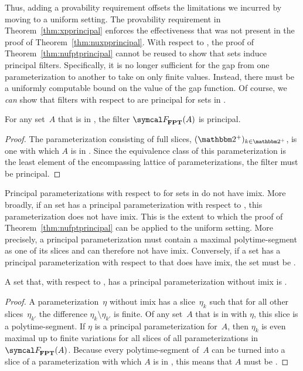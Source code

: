 Thus, adding a provability requirement offsets the limitations we incurred by moving to a uniform setting.
The provability requirement in Theorem~\ref{thm:xpprincipal} enforces the effectiveness that was not present in the proof of Theorem~\ref{thm:nuxpprincipal}.
With respect to , the proof of Theorem~\ref{thm:nufptprincipal} cannot be reused to show that  sets induce principal filters.
Specifically, it is no longer sufficient for the gap from one parameterization to another to take on only finite values.
Instead, there must be a uniformly computable bound on the value of the gap function.
Of course, we \emph{can} show that filters with respect to  are principal for sets in .
\begin{theorem}
\label{thm:fptprincipal}%
  For any set~$A$ that is in , the filter $\calF_\cl{FPT}(A)$ is principal.
\end{theorem}
\begin{proof}
  The parameterization consisting of full slices, $(\binary^+)_{k \in \binary^+}$, is one with which $A$ is in .
  Since the equivalence class of this parameterization is the least element of the encompassing lattice of parameterizations, the filter must be principal.
\end{proof}

%
%
Principal parameterizations with respect to  for sets in  do not have imix.
More broadly, if an  set has a principal parameterization with respect to , this parameterization does not have imix.
This is the extent to which the proof of Theorem~\ref{thm:nufptprincipal} can be applied to the uniform setting.
More precisely, a principal parameterization must contain a maximal polytime-segment as one of its slices and can therefore not have imix.
Conversely, if a set has a principal parameterization with respect to  that does have imix, the set must be .
\begin{lemma}
\label{lem:fptimix}%
  A set that, with respect to , has a principal parameterization without imix is .
\end{lemma}
\begin{proof}
  A parameterization~$\eta$ without imix has a slice~$\eta_k$ such that for all other slices~$\eta_{k'}$ the difference $\eta_k \setminus \eta_{k'}$ is finite.
  Of any set~$A$ that is in  with $\eta$, this slice is a polytime-segment.
  If $\eta$ is a principal parameterization for~$A$, then $\eta_k$ is even maximal up to finite variations for all slices of all parameterizations in~$\calF_\cl{FPT}(A)$.
  Because every polytime-segment of~$A$ can be turned into a slice of a parameterization with which $A$ is in , this means that $A$ must be .
\end{proof}
%

